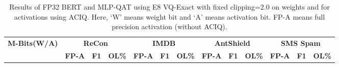 \documentclass{article}
\theoremstyle{definition}
\theoremstyle{remark}
\begin{document}
\begin{table}[h]
    \centering
    \caption{Results of FP32 BERT and MLP-QAT using E8 VQ-Exact with fixed clipping=2.0 on weights and for activations using ACIQ. Here, `W' means weight bit and `A' means activation bit. FP-A means full precision activation (without ACIQ).}
    \label{tab:aciq_mlp_appendix}
    \scriptsize
    \begin{tabular}{|p{1.45cm}|p{0.65cm}|p{0.65cm}|p{0.65cm}|p{0.65cm}|p{0.65cm}|p{0.65cm}|p{0.65cm}|p{0.65cm}|p{0.65cm}|p{0.65cm}|p{0.65cm}|p{0.65cm}|} \hline
         \multirow{2}{*}{\textbf{M-Bits(W/A)}}& \multicolumn{3}{|c|}{\textbf{ReCon}}& \multicolumn{3}{|c|}{\textbf{IMDB}} & \multicolumn{3}{|c|}{\textbf{AntShield}} & \multicolumn{3}{|c|}{\textbf{SMS Spam}}\\
         \cline{2-13}
         & \textbf{FP-A} &\textbf{F1}& \textbf{OL\%} & \textbf{FP-A }& \textbf{F1} & \textbf{OL\%} & \textbf{FP-A} & \textbf{F1} & \textbf{OL\%} & \textbf{FP-A} & \textbf{F1} & \textbf{OL\%} \\ \hline

\end{tabular}
\end{table}
\end{document}

